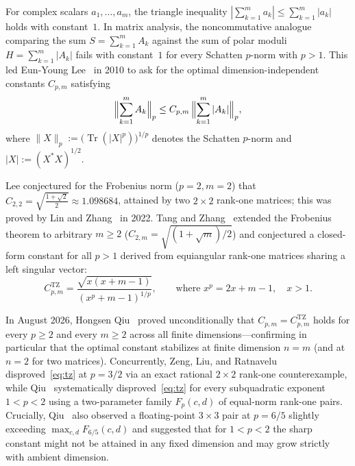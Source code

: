 \documentclass[10pt,letterpaper]{article}
\newcommand{\Tr}{\operatorname{Tr}}
\newcommand{\TZ}{\mathrm{TZ}}
\begin{document}
For complex scalars $a_1,\dots,a_m$, the triangle inequality $|\sum_{k=1}^m a_k| \le \sum_{k=1}^m |a_k|$ holds with constant~$1$. In matrix analysis, the noncommutative analogue comparing the sum $S = \sum_{k=1}^m A_k$ against the sum of polar moduli $H = \sum_{k=1}^m |A_k|$ fails with constant~$1$ for every Schatten $p$-norm with $p > 1$. This led Eun-Young Lee~\cite{Lee2010,Lee2011} in 2010 to ask for the optimal dimension-independent constants $C_{p,m}$ satisfying
\begin{equation}\label{eq:lee}
  \Bigl\|\sum_{k=1}^m A_k\Bigr\|_p \le C_{p,m}\,\Bigl\|\sum_{k=1}^m |A_k|\Bigr\|_p,
\end{equation}
where $\|X\|_p := \bigl(\Tr(|X|^p)\bigr)^{1/p}$ denotes the Schatten $p$-norm and $|X| := (X^* X)^{1/2}$.

Lee conjectured for the Frobenius norm ($p = 2, m = 2$) that $C_{2,2} = \sqrt{\frac{1+\sqrt{2}}{2}} \approx 1.098684$, attained by two $2\times 2$ rank-one matrices; this was proved by Lin and Zhang~\cite{LinZhang2022} in 2022. Tang and Zhang~\cite{TangZhang2026} extended the Frobenius theorem to arbitrary $m \ge 2$ ($C_{2,m} = \sqrt{(1+\sqrt{m})/2}$) and conjectured a closed-form constant for all $p > 1$ derived from equiangular rank-one matrices sharing a left singular vector:
\begin{equation}\label{eq:tz}
  C_{p,m}^{\TZ} = \frac{\sqrt{x(x + m - 1)}}{(x^p + m - 1)^{1/p}},
  \qquad \text{where } x^p = 2x + m - 1,\quad x > 1.
\end{equation}

In August 2026, Hongsen Qiu~\cite{Qiu2026} proved unconditionally that $C_{p,m} = C_{p,m}^{\TZ}$ holds for every $p \ge 2$ and every $m \ge 2$ across all finite dimensions—confirming in particular that the optimal constant stabilizes at finite dimension $n = m$ (and at $n = 2$ for two matrices). Concurrently, Zeng, Liu, and Ratnavelu~\cite{Zeng2026} disproved~\eqref{eq:tz} at $p = 3/2$ via an exact rational $2\times 2$ rank-one counterexample, while Qiu~\cite{Qiu2026} systematically disproved~\eqref{eq:tz} for every subquadratic exponent $1 < p < 2$ using a two-parameter family $F_p(c,d)$ of equal-norm rank-one pairs. Crucially, Qiu~\cite[\S5]{Qiu2026} also observed a floating-point $3\times 3$ pair at $p = 6/5$ slightly exceeding $\max_{c,d} F_{6/5}(c,d)$ and suggested that for $1 < p < 2$ the sharp constant might not be attained in any fixed dimension and may grow strictly with ambient dimension.
\end{document}
